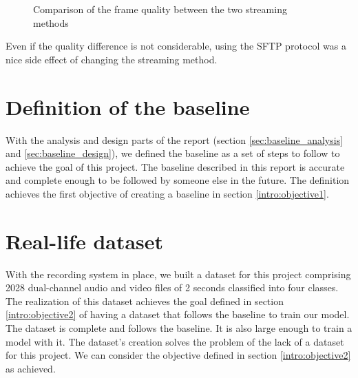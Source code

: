 \begin{figure}[H]
    \centering
    \qquad
    \caption{Comparison of the frame quality between the two streaming methods}
    \label{fig:streaming}
\end{figure}

Even if the quality difference is not considerable, using the SFTP protocol was a nice side effect of changing the streaming method.

\section{Definition of the baseline}

With the analysis and design parts of the report (section \ref{sec:baseline_analysis} and \ref{sec:baseline_design}), we defined the baseline as a set of steps to follow to achieve the goal of this project. The baseline described in this report is accurate and complete enough to be followed by someone else in the future. The definition achieves the first objective of creating a baseline in section \ref{intro:objective1}. 

\section{Real-life dataset}

With the recording system in place, we built a dataset for this project comprising 2028 dual-channel audio and video files of 2 seconds classified into four classes. The realization of this dataset achieves the goal defined in section \ref{intro:objective2} of having a dataset that follows the baseline to train our model. The dataset is complete and follows the baseline. It is also large enough to train a model with it. The dataset's creation solves the problem of the lack of a dataset for this project. We can consider the objective defined in section \ref{intro:objective2} as achieved.

